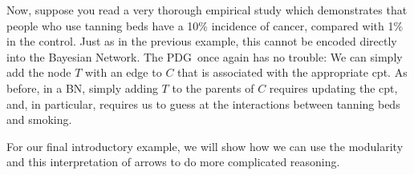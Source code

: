 \documentclass{article}
\newcommand{\MN}{PDG}
\numberwithin{equation}{section}
\begin{document}
\begin{notfocus}
\begin{example}
		Now, suppose you read a very thorough empirical study
                which demonstrates that people who use tanning beds
                have a 10\% incidence of cancer, compared with 1\% in
                the control. Just as in the previous example, this
                cannot be encoded directly into the Bayesian Network.  
		The \MN\, once again has no trouble:
We can simply add the node $T$ with an edge to $C$ that is associated with the
appropriate cpt.
%			
	        As before, in a BN, simply adding $T$ to the parents
                of $C$ requires updating the cpt, and, in particular,
                requires us to guess at the interactions between
                tanning beds and smoking. 
	\end{example}	



	
	\begin{vfull}
	For our final introductory example, we will show how we can use the modularity and this interpretation of arrows to do more complicated reasoning.


\end{vfull}
\end{notfocus}
\end{document}

